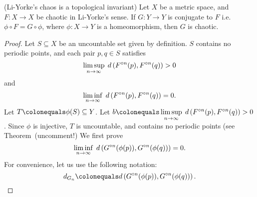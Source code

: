 \documentclass[12pt,draft,twoside]{book}
\begin{document}
\begin{theorem}
  (Li-Yorke's chaos is a topological invariant)
  Let $X$ be a metric space, and $F: X\to X$ be chaotic in Li-Yorke's sense.
  If $G: Y\to Y$ is conjugate to $F$ i.e. $\phi \circ F = G \circ \phi$, where $\phi: X \to Y$ is a homeomorphism, then $G$ is chaotic.
  \begin{proof}
    Let $S \subseteq X$ be an uncountable set given by definition.
    $S$ contains no periodic points, and each pair $p,q \in S$ satisfies
    \begin{equation*}
      \limsup\limits_{n \to \infty}\; d\left( F^{\circ n}(p) , F^{\circ n}(q) \right) > 0
    \end{equation*}
    and
    \begin{equation*}
      \liminf\limits_{n \to \infty}\; d\left( F^{\circ n}(p) , F^{\circ n}(q) \right) = 0.
    \end{equation*}
    Let $T \ceq \phi(S) \subseteq Y$.
    Let $b \ceq \limsup\limits_{n \to \infty}\; \metric{\itr{F}{n}(p) , \itr{F}{n}(q)} > 0$.
    Since $\phi$ is injective, $T$ is uncountable, and contains no periodic points (see Theorem~(uncomment!)%
    We first prove
    \begin{equation*}
      \liminf\limits_{n \to \infty}\; d\left( G^{\circ n}(\phi(p)) , G^{\circ n}(\phi(q)) \right) = 0.
    \end{equation*}
    For convenience, let us use the following notation:
    \begin{equation*}
      d_{G_n} \ceq \metric{\itr{G}{n}(\phi(p)) , \itr{G}{n}(\phi(q))}.
    \end{equation*}


\end{proof}
\end{theorem}
\end{document}
